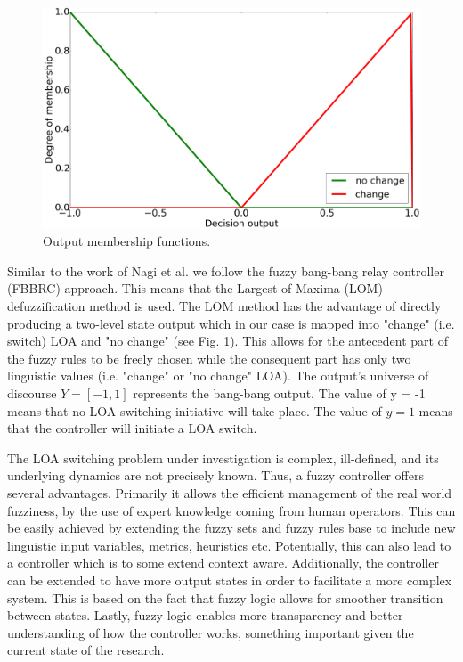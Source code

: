 \documentclass[a4paper,12pt,oneside,openright]{bhamthesis}
\begin{document}
\begin{figure}
	\centering
	\includegraphics[width=0.6\columnwidth]{chapter5_fig/fuzzy_output.png}
	\caption{Output membership functions.} 
	\label{fig:fuzzy_output}
\end{figure}

Similar to the work of Nagi et al. \cite{Nagi2009} we follow the fuzzy bang-bang relay controller (FBBRC) approach. This means that the Largest of Maxima (LOM) defuzzification method is used. The LOM method has the advantage of directly producing a two-level state output which in our case is mapped into "change" (i.e. switch) LOA and "no change" (see Fig. \ref{fig:fuzzy_output}). This allows for the antecedent part of the fuzzy rules to be freely chosen while the consequent part has only two linguistic values (i.e. "change" or "no change" LOA). The output's universe of discourse $Y = [-1,1]$ represents the bang-bang output. The value of y = -1 means that no LOA switching initiative will take place. The value of $y = 1$ means that the controller will initiate a LOA switch.

The LOA switching problem under investigation is complex, ill-defined, and its underlying dynamics are not precisely known. Thus, a fuzzy controller offers several advantages. Primarily it allows the efficient management of the real world fuzziness, by the use of expert knowledge coming from human operators. This can be easily achieved by extending the fuzzy sets and fuzzy rules base to include new linguistic input variables, metrics, heuristics etc. Potentially, this can also lead to a controller which is to some extend context aware. Additionally, the controller can be extended to have more output states in order to facilitate a more complex system. This is based on the fact that fuzzy logic allows for smoother transition between states. Lastly, fuzzy logic enables more transparency and better understanding of how the controller works, something important given the current state of the research.
\end{document}

